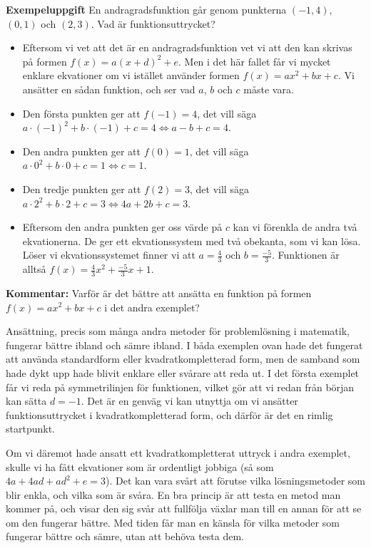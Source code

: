 \textbf{Exempeluppgift}
En andragradsfunktion går genom punkterna $(-1, 4)$, $(0, 1)$ och $(2, 3)$. Vad är funktionsuttrycket?

\begin{itemize}
  \item Eftersom vi vet att det är en andragradsfunktion vet vi att den kan skrivas på formen $f(x)=a(x+d)^2+e$.
  Men i det här fallet får vi mycket enklare ekvationer om vi istället använder formen $f(x)=ax^2+bx+c$.
  Vi ansätter en sådan funktion, och ser vad $a$, $b$ och $c$ måste vara.
  \item Den första punkten ger att $f(-1)=4$, det vill säga $a \cdot (-1)^2+b \cdot (-1)+c=4 \Leftrightarrow a-b+c=4$.
  \item Den andra punkten ger att $f(0)=1$, det vill säga $a \cdot 0^2+b \cdot 0 +c=1\Leftrightarrow c=1$.
  \item Den tredje punkten ger att $f(2)=3$, det vill säga $a \cdot 2^2+b \cdot 2+c=3 \Leftrightarrow 4a+2b+c=3$.
  \item Eftersom den andra punkten ger oss värde på $c$ kan vi förenkla de andra två ekvationerna.
  De ger ett ekvationssystem med två obekanta, som vi kan lösa.
  Löser vi ekvationssystemet finner vi att $a=\frac{4}{3}$ och $b=\frac{-5}{3}$.
  Funktionen är alltså $f(x)=\frac{4}{3}x^2 +\frac{-5}{3}x + 1$.
\end{itemize}

\textbf{Kommentar:} Varför är det bättre att ansätta en funktion på formen $f(x)=ax^2+bx+c$ i det andra exemplet?

Ansättning, precis som många andra metoder för problemlösning i matematik, fungerar bättre ibland och sämre ibland.
I båda exemplen ovan hade det fungerat att använda standardform eller kvadratkompletterad form, men de samband som hade dykt upp hade blivit enklare eller svårare att reda ut.
I det första exemplet får vi reda på symmetrilinjen för funktionen, vilket gör att vi redan från början kan sätta $d=-1$.
Det är en genväg vi kan utnyttja om vi ansätter funktionsuttrycket i kvadratkompletterad form, och därför är det en rimlig startpunkt.

Om vi däremot hade ansatt ett kvadratkompletterat uttryck i andra exemplet, skulle vi ha fått ekvationer som är ordentligt jobbiga (så som $4a+4ad+ad^2+e=3$).
Det kan vara svårt att förutse vilka lösningsmetoder som blir enkla, och vilka som är svåra.
En bra princip är att testa en metod man kommer på, och visar den sig svår att fullfölja växlar man till en annan för att se om den fungerar bättre.
Med tiden får man en känsla för vilka metoder som fungerar bättre och sämre, utan att behöva testa dem.
